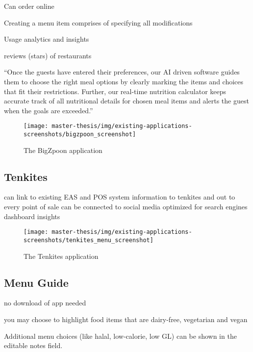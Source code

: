   Can order online

  Creating a menu item comprises of specifying all modifications

  Usage analytics and insights 

  reviews (stars) of restaurants

  “Once the guests have entered their preferences, our AI driven software guides them to choose the right meal options by clearly marking the items and choices that fit their restrictions.  Further, our real-time nutrition calculator keeps accurate track of all nutritional details for chosen meal items and alerts the guest when the goals are exceeded.”

  \begin{figure}[h]
    \centering
    \texttt{[image: master-thesis/img/existing-applications-screenshots/bigzpoon\_screenshot]}
    \caption{The BigZpoon application}
  \end{figure}

\subsection*{Tenkites}
  can link to existing EAS and POS system
  information to tenkites and out to every point of sale
  can be connected to social media
  optimized for search engines
  dashboard insights

  \begin{figure}[h]
    \centering
    \texttt{[image: master-thesis/img/existing-applications-screenshots/tenkites\_menu\_screenshot]}
    \caption{The Tenkites application}
  \end{figure}

\subsection*{Menu Guide}
  no download of app needed

  you may choose to highlight food items that are dairy-free, vegetarian and vegan

  Additional menu choices (like halal, low-calorie, low GL) can be shown in the editable notes field.

